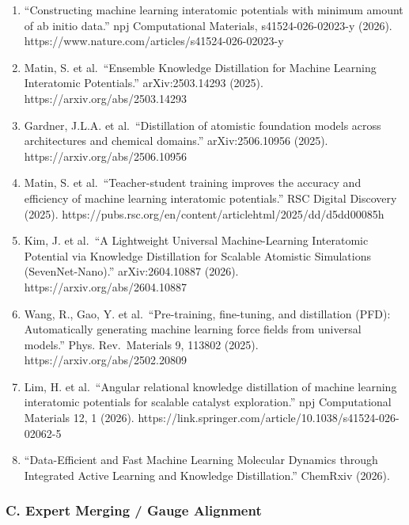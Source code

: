 \documentclass[
  12pt,
]{article}
\providecommand{\tightlist}{%
  \setlength{\itemsep}{0pt}\setlength{\parskip}{0pt}}
\begin{document}
\begin{enumerate}
\def\labelenumi{\arabic{enumi}.}
\setcounter{enumi}{6}
\tightlist
\item
  ``Constructing machine learning interatomic potentials with minimum
  amount of ab initio data.'' npj Computational Materials,
  s41524-026-02023-y (2026).
  https://www.nature.com/articles/s41524-026-02023-y
\item
  Matin, S. et al.~``Ensemble Knowledge Distillation for Machine
  Learning Interatomic Potentials.'' arXiv:2503.14293 (2025).
  https://arxiv.org/abs/2503.14293
\item
  Gardner, J.L.A. et al.~``Distillation of atomistic foundation models
  across architectures and chemical domains.'' arXiv:2506.10956 (2025).
  https://arxiv.org/abs/2506.10956
\item
  Matin, S. et al.~``Teacher-student training improves the accuracy and
  efficiency of machine learning interatomic potentials.'' RSC Digital
  Discovery (2025).
  https://pubs.rsc.org/en/content/articlehtml/2025/dd/d5dd00085h
\item
  Kim, J. et al.~``A Lightweight Universal Machine-Learning Interatomic
  Potential via Knowledge Distillation for Scalable Atomistic
  Simulations (SevenNet-Nano).'' arXiv:2604.10887 (2026).
  https://arxiv.org/abs/2604.10887
\item
  Wang, R., Gao, Y. et al.~``Pre-training, fine-tuning, and distillation
  (PFD): Automatically generating machine learning force fields from
  universal models.'' Phys. Rev.~Materials 9, 113802 (2025).
  https://arxiv.org/abs/2502.20809
\item
  Lim, H. et al.~``Angular relational knowledge distillation of machine
  learning interatomic potentials for scalable catalyst exploration.''
  npj Computational Materials 12, 1 (2026).
  https://link.springer.com/article/10.1038/s41524-026-02062-5
\item
  ``Data-Efficient and Fast Machine Learning Molecular Dynamics through
  Integrated Active Learning and Knowledge Distillation.'' ChemRxiv
  (2026).
\end{enumerate}

\subsubsection{C. Expert Merging / Gauge
Alignment}\label{c.-expert-merging-gauge-alignment}
\end{document}
